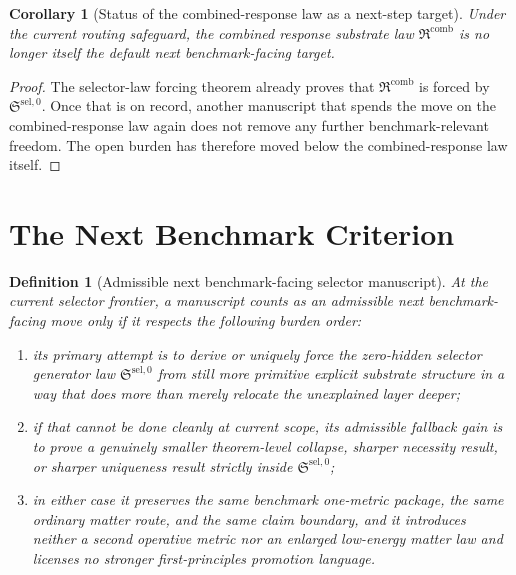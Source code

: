 \documentclass[11pt]{article}
\newcommand{\CombinedLaw}{\mathfrak R^{\mathrm{comb}}}
\newcommand{\SelectorLaw}{\mathfrak S^{\mathrm{sel},0}}
\newtheorem{definition}{Definition}
\newtheorem{corollary}{Corollary}
\begin{document}
\begin{corollary}[Status of the combined-response law as a next-step target]
Under the current routing safeguard, the combined response substrate law \(\CombinedLaw\) is no longer itself the default next benchmark-facing target.
\end{corollary}

\begin{proof}
The selector-law forcing theorem already proves that \(\CombinedLaw\) is forced by \(\SelectorLaw\). Once that is on record, another manuscript that spends the move on the combined-response law again does not remove any further benchmark-relevant freedom. The open burden has therefore moved below the combined-response law itself.
\end{proof}

\section{The Next Benchmark Criterion}

\begin{definition}[Admissible next benchmark-facing selector manuscript]
At the current selector frontier, a manuscript counts as an admissible next benchmark-facing move only if it respects the following burden order:
\begin{enumerate}
    \item its primary attempt is to derive or uniquely force the zero-hidden selector generator law \(\SelectorLaw\) from still more primitive explicit substrate structure in a way that does more than merely relocate the unexplained layer deeper;
    \item if that cannot be done cleanly at current scope, its admissible fallback gain is to prove a genuinely smaller theorem-level collapse, sharper necessity result, or sharper uniqueness result strictly inside \(\SelectorLaw\);
    \item in either case it preserves the same benchmark one-metric package, the same ordinary matter route, and the same claim boundary, and it introduces neither a second operative metric nor an enlarged low-energy matter law and licenses no stronger first-principles promotion language.
\end{enumerate}
\end{definition}
\end{document}

